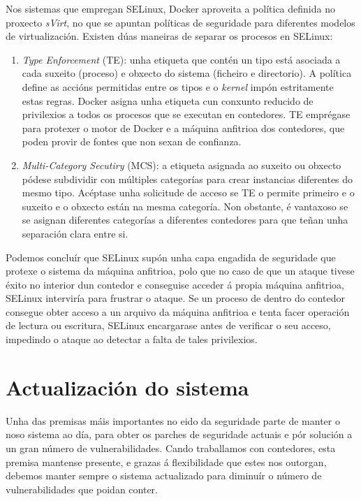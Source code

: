 Nos sistemas que empregan \gls{SELinux}, Docker aproveita a política definida no proxecto \textit{sVirt}, no que se apuntan políticas de seguridade para diferentes modelos de virtualización. Existen dúas maneiras de separar os procesos en \gls{SELinux}:

\begin{enumerate}
    \item \textit{Type Enforcement} (TE): unha etiqueta que contén un tipo está asociada a cada suxeito (proceso) e obxecto do sistema (ficheiro e directorio). A política define as accións permitidas entre os tipos e o \textit{kernel} impón estritamente estas regras. Docker asigna unha etiqueta cun conxunto reducido de privilexios a todos os procesos que se executan en contedores. TE emprégase para protexer o motor de Docker e a máquina anfitrioa dos contedores, que poden provir de fontes que non sexan de confianza.
    
    \item \textit{Multi-Category Secutiry} (MCS): a etiqueta asignada ao suxeito ou obxecto pódese subdividir con múltiples categorías para crear instancias diferentes do mesmo tipo. Acéptase unha solicitude de acceso se TE o permite primeiro e o suxeito e o obxecto están na mesma categoría. Non obstante, é vantaxoso se se asignan diferentes categorías a diferentes contedores para que teñan unha separación clara entre si.
\end{enumerate}

Podemos concluír que \gls{SELinux} supón unha capa engadida de seguridade que protexe o sistema da máquina anfitrioa, polo que no caso de que un ataque tivese éxito no interior dun contedor e conseguise acceder á propia máquina anfitrioa, \gls{SELinux} interviría para frustrar o ataque. Se un proceso de dentro do contedor consegue obter acceso a un arquivo da máquina anfitrioa e tenta facer operación de lectura ou escritura, \gls{SELinux} encargarase antes de verificar o seu acceso, impedindo o ataque ao detectar a falta de tales privilexios. \cite{SELinuxMitigates}

\section{Actualización do sistema}
\label{actualizacionSistema}

Unha das premisas máis importantes no eido da seguridade parte de manter o noso sistema ao día, para obter os parches de seguridade actuais e pór solución a un gran número de vulnerabilidades. Cando traballamos con contedores, esta premisa mantense presente, e grazas á flexibilidade que estes nos outorgan, debemos manter sempre o sistema actualizado para diminuír o número de vulnerabilidades que poidan conter.\\

